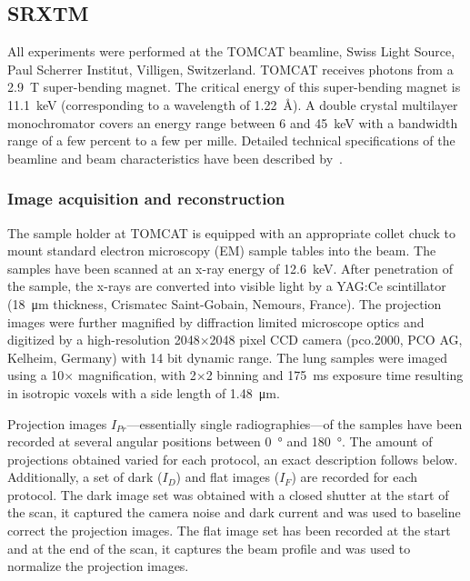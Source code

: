 \subsection{SRXTM}
All experiments were performed at the TOMCAT beamline, Swiss Light Source, Paul Scherrer Institut, Villigen, Switzerland. %
TOMCAT receives photons from a \SI{2.9}{\tesla} super-bending magnet. The critical energy of this super-bending magnet is \SI{11.1}{\kilo\electronvolt} (corresponding to a wavelength of \SI{1.22}{\angstrom}). A double crystal multilayer monochromator covers an energy range between 6 and \SI{45}{\kilo\electronvolt} with a bandwidth range of a few percent to a few per mille. Detailed technical specifications of the beamline and beam characteristics have been described by~\citet{Stampanoni2006a,Stampanoni2007}.

\subsubsection{Image acquisition and reconstruction}
\label{seq:Image Acquisition}
The sample holder at TOMCAT is equipped with an appropriate collet chuck to mount standard electron microscopy (EM) sample tables into the beam. The samples have been scanned at an x-ray energy of \SI{12.6}{\kilo\electronvolt}. After penetration of the sample, the x-rays are converted into visible light by a YAG:Ce scintillator (\SI{18}{\micro\meter} thickness, Crismatec Saint-Gobain, Nemours, France). The projection images were further magnified by diffraction limited microscope optics and digitized by a high-resolution 2048\(\times\)2048 pixel CCD camera (pco.2000, PCO AG, Kelheim, Germany) with 14 bit dynamic range.%
The lung samples were imaged using a 10\(\times\) magnification, with 2\(\times\)2 binning and \SI{175}{\milli\second} exposure time resulting in isotropic voxels with a side length of \SI{1.48}{\micro\meter}.
\cbstart

Projection images $I_{Pr}$---essentially single radiographies---of the samples have been recorded at several angular positions between \SI{0}{\degree} and \SI{180}{\degree}. The amount of projections obtained varied for each protocol, an exact description follows below. Additionally, a set of dark ($I_{D}$) and flat images ($I_{F}$) are recorded for each protocol. The dark image set was obtained with a closed shutter at the start of the scan, it captured the camera noise and dark current and was used to baseline correct the projection images. The flat image set has been recorded at the start and at the end of the scan, it captures the beam profile and was used to normalize the projection images.

